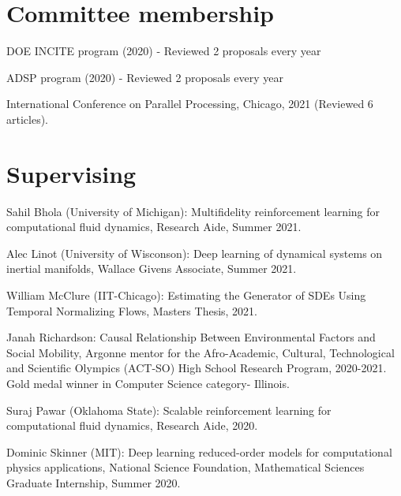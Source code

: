 \documentclass[letterpaper]{article}
\renewenvironment{itemize}{
  \begin{list}{}{
    \setlength{\leftmargin}{1.5em}
  }
}{
  \end{list}
}
\begin{document}
\section*{Committee membership}

\begin{itemize}
\item DOE INCITE program (2020) - Reviewed 2 proposals every year
\item ADSP program (2020) - Reviewed 2 proposals every year
\item International Conference on Parallel Processing, Chicago, 2021 (Reviewed 6 articles).
\end{itemize}

\section*{Supervising}

\begin{itemize}

  \item Sahil Bhola (University of Michigan): Multifidelity reinforcement learning for computational fluid dynamics, Research Aide, Summer 2021.

  \item Alec Linot (University of Wisconson): Deep learning of dynamical systems on inertial manifolds, Wallace Givens Associate, Summer 2021.

  \item William McClure (IIT-Chicago): Estimating the Generator of SDEs Using Temporal Normalizing Flows, Masters Thesis, 2021. 

  \item Janah Richardson: Causal Relationship Between Environmental Factors and Social Mobility, Argonne mentor for the Afro-Academic, Cultural, Technological and Scientific Olympics (ACT-SO) High School Research Program, 2020-2021. Gold medal winner in Computer Science category- Illinois.

  \item Suraj Pawar (Oklahoma State): Scalable reinforcement learning for computational fluid dynamics, Research Aide, 2020.

  \item Dominic Skinner (MIT): Deep learning reduced-order models for computational physics applications, National Science Foundation, Mathematical Sciences Graduate Internship, Summer 2020.

\end{itemize}
\end{document}
